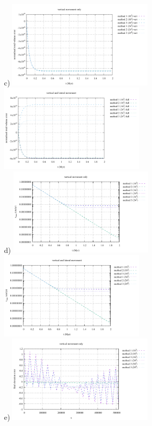 \begin{center}
c) \includegraphics[width=7cm]{python_codes/fieldstone_54/images/exp1/volume_vert.pdf}
   \includegraphics[width=7cm]{python_codes/fieldstone_54/images/exp1/volume_full.pdf}\\
d) \includegraphics[width=7cm]{python_codes/fieldstone_54/images/exp1/vrms_vert.pdf}
   \includegraphics[width=7cm]{python_codes/fieldstone_54/images/exp1/vrms_full.pdf}\\
e) \includegraphics[width=7cm]{python_codes/fieldstone_54/images/exp1/surface_topography_200_vert.pdf}

\end{center}
